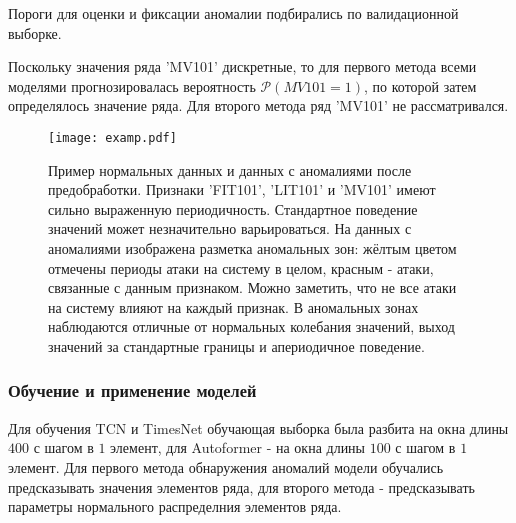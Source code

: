 \documentclass{article}
\begin{document}
Пороги для оценки и фиксации аномалии подбирались по валидационной выборке. 

Поскольку значения ряда 'MV101' дискретные, то для первого метода всеми моделями прогнозировалась вероятность $\mathcal{P} (MV101 = 1)$, по которой затем определялось значение ряда. Для второго метода ряд 'MV101' не рассматривался. 

\begin{figure}[H]
    	\centering
    \texttt{[image: examp.pdf]}
 	\caption{Пример нормальных данных и данных с аномалиями после предобработки. Признаки 'FIT101', 'LIT101' и 'MV101' имеют сильно выраженную периодичность. Стандартное поведение значений может незначительно варьироваться. На данных с аномалиями изображена разметка аномальных зон: жёлтым цветом отмечены периоды атаки на систему в целом, красным - атаки, связанные с данным признаком. Можно заметить, что не все атаки на систему влияют на каждый признак. В аномальных зонах наблюдаются отличные от нормальных колебания значений, выход значений за стандартные границы и апериодичное поведение.}
 \label{example}
\end{figure}

\subsubsection{Обучение и применение моделей}
Для обучения TCN и TimesNet обучающая выборка была разбита на окна длины $400$ с шагом в $1$ элемент, для Autoformer - на окна длины $100$ с шагом в $1$ элемент. Для первого метода обнаружения аномалий модели обучались предсказывать значения элементов ряда, для второго метода - предсказывать параметры нормального распределния элементов ряда. 
\end{document}
